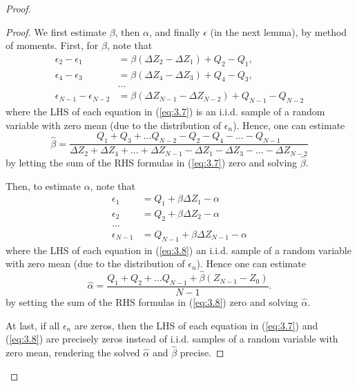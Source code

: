 \begin{proof}
\begin{proof}
We first estimate $\beta$, then $\alpha$, and finally $\epsilon$ (in the next lemma), by method of moments. First, for $\beta$, note that \begin{equation}
\begin{aligned}
    \epsilon_2-\epsilon_1&=\beta(\Delta Z_{2}-\Delta Z_1)+Q_{2}-Q_1,\\
    \epsilon_4-\epsilon_3&=\beta(\Delta Z_{4}-\Delta Z_3)+Q_{4}-Q_3,\\
    &\ldots\\
    \epsilon_{N-1}-\epsilon_{N-2}&=\beta(\Delta Z_{N-1}-\Delta Z_{N-2})+Q_{N-1}-Q_{N-2}
\end{aligned}\label{eq:3.7}
\end{equation} where the LHS of each equation in (\ref{eq:3.7}) is an i.i.d. sample of a random variable with zero mean (due to the distribution of $\epsilon_n$). Hence, one can estimate $$\hat\beta=\frac{Q_1+Q_3+\ldots Q_{N-2}-Q_2-Q_4-\ldots-Q_{N-1}}{\Delta Z_2+\Delta Z_4+\ldots+\Delta Z_{N-1}-\Delta Z_1-\Delta Z_3-\ldots-\Delta Z_{N-2}}$$ by letting the sum of the RHS formulas in (\ref{eq:3.7}) zero and solving $\hat\beta$.

Then, to estimate $\alpha$, note that
\begin{equation}
    \begin{aligned}
        \epsilon_1&=Q_1+\beta\Delta Z_1-\alpha\\
        \epsilon_2&=Q_2+\beta\Delta Z_2-\alpha\\
        \ldots\\
        \epsilon_{N-1}&=Q_{N-1}+\beta\Delta Z_{N-1}-\alpha
    \end{aligned}\label{eq:3.8}
\end{equation}
where the LHS of each equation in (\ref{eq:3.8}) an i.i.d. sample of a random variable with zero mean (due to the distribution of $\epsilon_n$). Hence one can estimate
$$\hat\alpha=\frac{Q_1+Q_2+\ldots Q_{N-1}+\hat\beta(Z_{N-1}-Z_0)}{N-1}.$$ by setting the sum of the RHS formulas in (\ref{eq:3.8}) zero and solving $\hat\alpha$.

At last, if all $\epsilon_n$ are zeros, then the LHS of each equation in (\ref{eq:3.7}) and (\ref{eq:3.8}) are precisely zeros instead of i.i.d. samples of a random variable with zero mean, rendering the solved $\hat\alpha$ and $\hat\beta$ precise.
\end{proof}


\end{proof}
